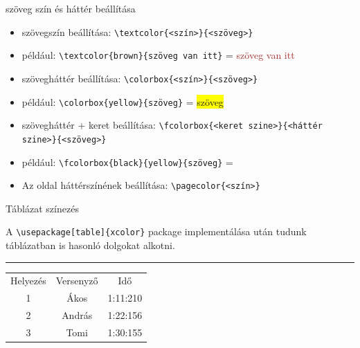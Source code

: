 \documentclass[aspectratio=1610, dvipsnames, xcolor=table]{beamer}
\begin{document}
    \begin{frame}[fragile]{szöveg szín és háttér beállítása}
        
        \begin{itemize}            
            \item {} szövegszín beállítása: \verb!\textcolor{<szín>}{<szöveg>}!
            \item {} például: \verb!\textcolor{brown}{szöveg van itt}! = \textcolor{brown}{szöveg van itt}
            \item {} szövegháttér beállítása: \verb!\colorbox{<szín>}{<szöveg>}!
            \item {} például: \verb!\colorbox{yellow}{szöveg}! = \colorbox{yellow}{szöveg}
            \item {} szövegháttér + keret beállítása: \verb!\fcolorbox{<keret szine>}{<háttér szine>}{<szöveg>}!
            \item {} például: \verb!\fcolorbox{black}{yellow}{szöveg}! = 
            \item {} Az oldal háttérszínének beállítása: \verb!\pagecolor{<szín>}!
        \end{itemize}
    \end{frame}
    
    \begin{frame}[fragile]{Táblázat színezés}
        \begin{center}
            A \verb!\usepackage[table]{xcolor}! package implementálása után tudunk táblázatban is hasonló dolgokat alkotni.
            \noindent
            {\color{Dandelion} \rule{\linewidth}{1mm}}
        \end{center}

        \vfill
        \begin{center}
            \begin{tabular}{|c|c|c|}
                \hline
                \rowcolor{Apricot}Helyezés & Versenyző & Idő \\
                \cellcolor{ForestGreen}1 & \cellcolor{Orchid}Ákos & \cellcolor{Aquamarine}1:11:210 \\
                \cellcolor{Yellow}2  & \cellcolor{Mulberry}András & \cellcolor{Emerald}1:22:156  \\
                \cellcolor{BurntOrange}3 & \cellcolor{Plum}Tomi  &  \cellcolor{PineGreen}1:30:155 \\
                \hline
            \end{tabular}
        \end{center}
    \end{frame}
\end{document}
